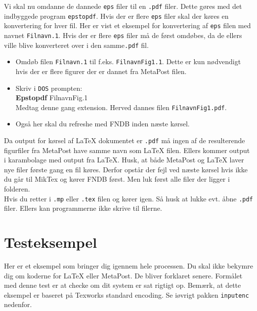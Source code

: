 \documentclass{article}
\begin{document}
Vi skal nu omdanne de dannede \verb"eps" filer til en \verb".pdf" filer. Dette gøres med det indbyggede program \verb"epstopdf".
Hvis der er flere \verb"eps" filer skal der køres en konvertering for hver fil. Her er vist et eksempel for konvertering af \verb"eps" filen med navnet \verb"Filnavn.1".
Hvis der er flere \verb"eps" filer må de først omdøbes, da de ellers ville blive konverteret over i den samme\verb".pdf" fil.
\begin{itemize}
\item Omdøb filen \verb"Filnavn.1" til f.eks. \verb"FilnavnFig1.1". Dette er kun nødvendigt hvis der er flere figurer der er dannet fra MetaPost filen.
\item Skriv i \verb"DOS" prompten:\\
\textbf{Epstopdf} FilnavnFig.1\\
Medtag denne gang extension. Herved dannes filen \verb"FilnavnFig1.pdf". 
\item Også her skal du refreshe med FNDB inden næste kørsel.
\end{itemize}
Da output for kørsel af \LaTeX{} dokumentet er \verb".pdf" må ingen af de resulterende figurfiler fra MetaPost have samme navn som \LaTeX{} filen. Ellers kommer output i karambolage med output fra \LaTeX{}.
Husk, at både MetaPost og \LaTeX{} laver nye filer første gang en fil køres. Derfor opstår der fejl ved næste kørsel hvis ikke du går til MikTex og kører FNDB først. Men luk først alle filer der ligger i folderen. \\
Hvis du retter i \verb".mp" eller \verb".tex" filen og kører igen. Så husk at lukke evt. åbne \verb".pdf" filer. Ellers kan programmerne ikke skrive til filerne.

\section{Testeksempel}

Her er et eksempel som bringer dig igennem hele processen. Du skal ikke bekymre dig om koderne for \LaTeX{} eller MetaPost. De bliver forklaret senere. Formålet med denne test er at checke om dit system er sat rigtigt op. Bemærk, at dette eksempel er baseret på Texworks standard encoding. Se iøvrigt pakken \verb"inputenc" nedenfor. 
\end{document}
